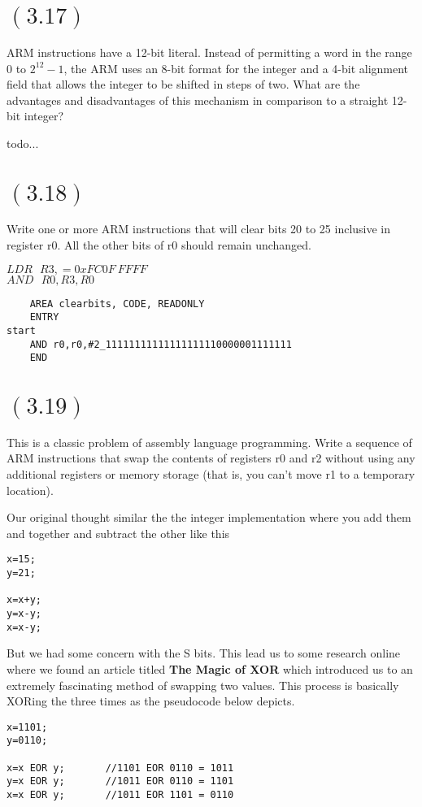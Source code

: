 \documentclass[letterpaper,12pt,titlepage]{article}
\begin{document}
\section*{$(3.17)$} ARM instructions have a 12-bit literal. Instead of permitting a word in the range 0 to $2^12 - 1$, the ARM uses an 8-bit format for the integer and a 4-bit alignment field that allows the integer to be shifted in steps of two. What are the advantages and disadvantages of this mechanism in comparison to a straight 12-bit integer? \newline

\begin{mdframed}[style=MyFrame]
todo...
\end{mdframed}

\newpage
\section*{$(3.18)$} Write one or more ARM instructions that will clear bits 20 to 25 inclusive in register r0. All the other bits of r0 should remain unchanged.
\begin{mdframed}[style=MyFrame]
$LDR~~~ R3, = 0xFC0F~FFFF $\\
$AND~~~ R0,R3,R0$
\end{mdframed}

\begin{lstlisting}
    AREA clearbits, CODE, READONLY 
    ENTRY
start
    AND r0,r0,#2_11111111111111111110000001111111
    END
\end{lstlisting}

\section*{$(3.19)$} This is a classic problem of assembly language programming. Write a sequence of ARM instructions that swap the contents of registers r0 and r2 without using any additional registers or memory storage (that is, you can't move r1 to a temporary location).
\begin{mdframed}[style=MyFrame]
Our original thought similar the the integer implementation where you add them and together and subtract the other like this
\begin{verbatim}
x=15;
y=21;

x=x+y;
y=x-y;
x=x-y;
\end{verbatim}
But we had some concern with the S bits. This lead us to some research online where we found an article titled \textbf{The Magic of XOR} \cite{Charles} which introduced us to an extremely fascinating method of swapping two values. This process is basically XORing the three times as the pseudocode below depicts.
\begin{verbatim}
x=1101;
y=0110;

x=x EOR y;       //1101 EOR 0110 = 1011
y=x EOR y;       //1011 EOR 0110 = 1101
x=x EOR y;       //1011 EOR 1101 = 0110
\end{verbatim}
\vspace{-0.5cm}
\end{mdframed}
\end{document}
